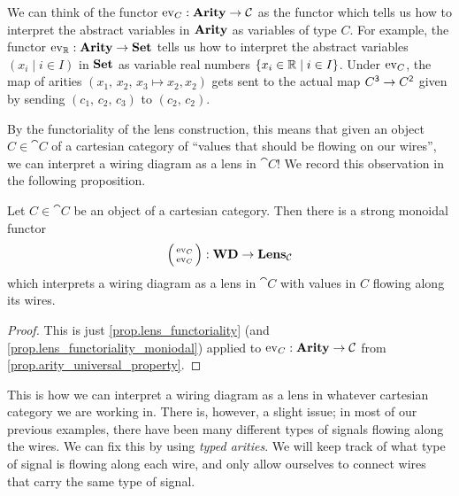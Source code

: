 \documentclass[DynamicalBook]{subfiles}
\begin{document}
We can think of the functor $\mathrm{ev}_C : \textbf{Arity} \to \mathcal{C}$ as the functor
which tells us how to interpret the abstract variables in $\textbf{Arity}$ as variables
of type $C$. For example, the functor $\mathrm{ev}_{\mathbb{R}} : \textbf{Arity} \to \textbf{Set}$ tells
us how to interpret the abstract variables $(x_i \mid i \in I)$ in $\textbf{Set}$ as
variable real numbers $\{x_i \in \mathbb{R} \mid i \in I\}$. Under $\mathrm{ev}_{C}$, the
map of arities $(x_1,\, x_2,\, x_3 \mapsto x_2, x_2)$ gets sent to the actual map
$C^{\mathsf{3}} \to C^{\mathsf{2}}$ given by sending $(c_1,\, c_2,\, c_3)$ to
$(c_2,\, c_2)$.

By the functoriality of the lens construction, this means that given an object
$C \in \cat{C}$ of a cartesian category of ``values that should be flowing on
our wires'', we can interpret a wiring diagram as a lens in $\cat{C}$! We record
this observation in the following proposition. 
\begin{proposition}\label{prop.wiring_diagram_as_lens}
  Let $C \in \cat{C}$ be an object of a cartesian category. Then there is a
  strong monoidal functor
  $$\lens{\Fun{ev}_C}{\Fun{ev}_C} : \Cat{WD} \to \Cat{Lens}_{\cat{C}}$$
  which interprets a wiring diagram as a lens in $\cat{C}$ with values in $C$
  flowing along its wires.
\end{proposition}
\begin{proof}
  This is just \cref{prop.lens_functoriality} (and
  \cref{prop.lens_functoriality_moniodal}) applied to $\mathrm{ev}_C : \textbf{Arity} \to
  \mathcal{C}$ from \cref{prop.arity_universal_property}.
\end{proof}

This is how we can interpret a wiring diagram as a lens in whatever cartesian category we
are working in. There is, however, a slight issue; in most of our previous
examples, there have been many different types of signals flowing along the
wires. We can fix this by using \emph{typed arities}. We will keep track of what
type of signal is flowing along each wire, and only allow ourselves to connect
wires that carry the same type of signal.
\end{document}
